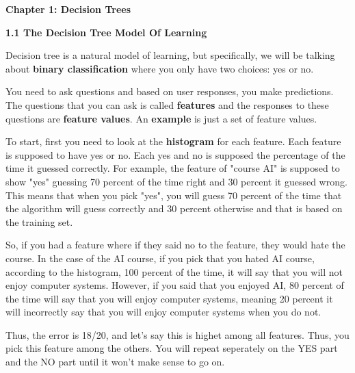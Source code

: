 \documentclass{article}
\begin{document}
\begin{center}
    \Huge \textbf{Chapter 1: Decision Trees}
    \vspace{0.7cm}
\end{center}


\newpage

\LARGE \textbf{1.1 The Decision Tree Model Of Learning}

\vspace{0.5cm}

\large Decision tree is a natural model of learning, but specifically, we will be talking about \textbf{binary classification} where you only have two choices: yes or no.

\vspace{0.5cm}

You need to ask questions and based on user responses, you make predictions. The questions that you can ask is called \textbf{features} and the responses to these questions are \textbf{feature values}. An \textbf{example} is just a set of feature values.

\vspace{0.5cm}

To start, first you need to look at the \textbf{histogram} for each feature. Each feature is supposed to have yes or no.  Each yes and no is supposed the percentage of the time it guessed correctly. For example, the feature of "course AI" is supposed to show "yes" guessing 70 percent of the time right and 30 percent it guessed wrong. This means that when you pick "yes", you will guess 70 percent of the time that the algorithm will guess correctly and 30 percent otherwise and that is based on the training set.

\vspace{0.5cm}

So, if you had a feature where if they said no to the feature, they would hate the course. In the case of the AI course, if you pick that you hated AI course, according to the histogram, 100 percent of the time, it will say that you will not enjoy computer systems. However, if you said that you enjoyed AI, 80 percent of the time will say that you will enjoy computer systems, meaning 20 percent it will incorrectly say that you will enjoy computer systems when you do not.

\vspace{0.5cm}

Thus, the error is 18/20, and let's say this is highet among all features. Thus, you pick this feature among the others. You will repeat seperately on the YES part and the NO part until it won't make sense to go on.
\end{document}
